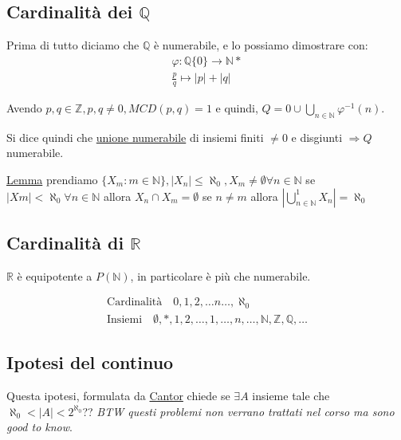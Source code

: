 \documentclass{article}
\begin{document}
\subsection{Cardinalità dei $\mathbb{Q}$}

Prima di tutto diciamo che $\mathbb{Q}$ è numerabile, e lo possiamo dimostrare con:
\begin{align*}
        \varphi : \mathbb{Q}\{0\} \to \mathbb{N}* \\
        \frac{p}{q} \mapsto |p| + |q|
\end{align*}

Avendo $p,q \in \mathbb{Z}, p,q \not = 0, MCD(p,q)=1$ e quindi, $Q = {0} \cup \bigcup_{n \in \mathbb{N}}{\varphi^{-1}(n)}$.

Si dice quindi che \underline{unione numerabile} di insiemi finiti $\not = 0$ e disgiunti $\Rightarrow Q $ numerabile. \newline


\underline{Lemma} prendiamo $\{X_m : m \in \mathbb{N}\}, |X_n| \le \aleph_0, X_m \not = \emptyset \forall n \in \mathbb{N}$ se $|Xm| < \aleph_0 \forall n \in \mathbb{N}$ allora $X_n \cap X_m = \emptyset$ se $n \not = m$ allora $|\bigcup_{n \in \mathbb{N}}^{1}X_n| = \aleph_0$ \newline



\subsection{Cardinalità di $\mathbb{R}$}
$ \mathbb{R}$ è equipotente a $P(\mathbb{N})$, in particolare è più che numerabile. \par

\begin{align*}
        \mbox{Cardinalità} \quad 0,1,2,\ldots n\ldots,\aleph_0 \\
        \mbox{Insiemi} \quad \emptyset, {*}, {1,2}, \ldots, {1,\ldots,n},\ldots,\mathbb{N},\mathbb{Z},\mathbb{Q},\ldots        
\end{align*}



\subsection{Ipotesi del continuo}
Questa ipotesi, formulata da \underline{Cantor} chiede se $ \exists A$ insieme tale che $\aleph_0 < |A| < 2^{\aleph_0}$?? 
\textit{BTW questi problemi non verrano trattati nel corso ma sono good to know}.
\end{document}
